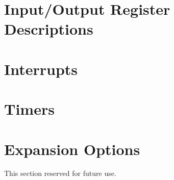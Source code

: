 \documentclass[12pt]{article}
\begin{document}
    \section{Input/Output Register Descriptions} \label{sec:IOregisterDescriptions} 

    \section{Interrupts} \label{sec:Interrupts} 

    \section{Timers} \label{sec:Timers} 

    \section{Expansion Options}

    This section reserved for future use.

    
\end{document}
